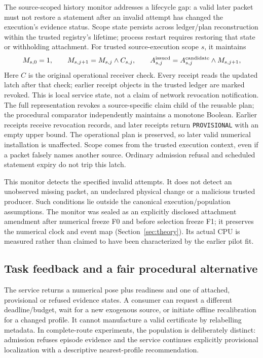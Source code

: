 The source-scoped history monitor addresses a lifecycle gap: a valid later packet must not restore a statement after an invalid attempt has changed the execution's evidence status. Scope state persists across ledger/plan reconstruction within the trusted registry's lifetime; process restart requires restoring that state or withholding attachment. For trusted source-execution scope $s$, it maintains
\begin{equation}
M_{s,0}=1,\qquad M_{s,j+1}=M_{s,j}\land C_{s,j},\qquad
A^{\rm issued}_{s,j}=A^{\rm candidate}_{s,j}\land M_{s,j+1},\label{eq:history-latch}
\end{equation}
Here $C$ is the original operational receiver check. Every receipt reads the updated latch after that check; earlier receipt objects in the trusted ledger are marked revoked. This is local service state, not a claim of network revocation notification. The full representation revokes a source-specific claim child of the reusable plan; the procedural comparator independently maintains a monotone Boolean. Earlier receipts receive revocation records, and later receipts return \texttt{PROVISIONAL} with an empty upper bound. The operational plan is preserved, so later valid numerical installation is unaffected. Scope comes from the trusted execution context, even if a packet falsely names another source. Ordinary admission refusal and scheduled statement expiry do not trip this latch.

This monitor detects the specified invalid attempts. It does not detect an unobserved missing packet, an undeclared physical change or a malicious trusted producer. Such conditions lie outside the canonical execution/population assumptions. The monitor was sealed as an explicitly disclosed attachment amendment after numerical freeze F0 and before selection freeze F1; it preserves the numerical clock and event map (Section~\ref{sec:theory}). Its actual CPU is measured rather than claimed to have been characterized by the earlier pilot fit.

\subsection{Task feedback and a fair procedural alternative}
The service returns a numerical pose plus readiness and one of attached, provisional or refused evidence states. A consumer can request a different deadline/budget, wait for a new exogenous source, or initiate offline recalibration for a changed profile. It cannot manufacture a valid certificate by relabelling metadata. In complete-route experiments, the population is deliberately distinct: admission refuses episode evidence and the service continues explicitly provisional localization with a descriptive nearest-profile recommendation.

